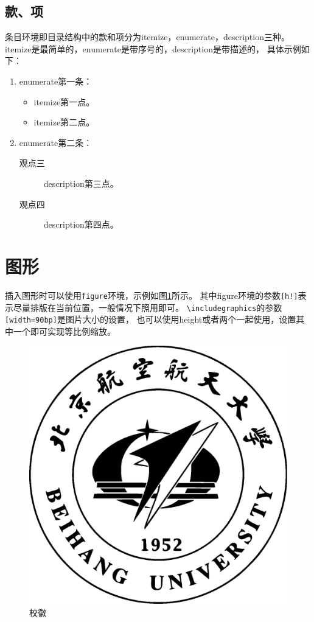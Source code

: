 \subsection{款、项}
\label{subsec-item}
条目环境即目录结构中的款和项分为itemize，enumerate，description三种。
itemize是最简单的，enumerate是带序号的，description是带描述的，
具体示例如下：

\begin{enumerate}
    \item enumerate第一条：
        \begin{itemize}
            \item itemize第一点。
            \item itemize第二点。
        \end{itemize}
    \item enumerate第二条：
        \begin{description}
            \item[观点三] description第三点。
            \item[观点四] description第四点。
        \end{description}
\end{enumerate}

\section{图形}
\label{sec-figure}
插入图形时可以使用\texttt{figure}环境，示例如图\ref{fig-sample}所示。
其中figure环境的参数\verb|[h!]|表示尽量排版在当前位置，一般情况下照用即可。
\verb|\includegraphics|的参数\verb|[width=90bp]|是图片大小的设置，
也可以使用height或者两个一起使用，设置其中一个即可实现等比例缩放。
\begin{figure}[h!]
    \centering
    \includegraphics[width=90bp]{figure/buaamark.eps}
    \caption{校徽}
    \label{fig-sample}
\end{figure}

